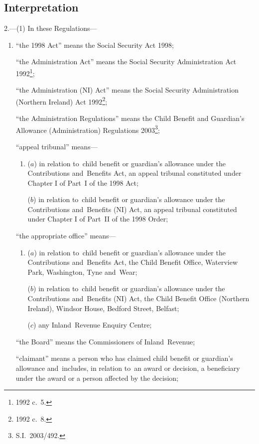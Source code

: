 \documentclass[12pt,a4paper]{article}
\begin{document}
\subsection[2. Interpretation]{Interpretation}

2.---(1)  In these Regulations—
\begin{enumerate}\item[]
“the 1998 Act” means the Social Security Act 1998;

“the Administration Act” means the Social Security Administration Act 1992\footnote{1992 c.~5.};

“the Administration (NI) Act” means the Social Security Administration (Northern Ireland) Act 1992\footnote{1992 c.~8.};

\begin{sloppypar}
“the Administration Regulations” means the Child Benefit and Guardian’s Allowance (Administration) Regulations 2003\footnote{S.I.~2003/492.};
\end{sloppypar}

“appeal tribunal” means—
\begin{enumerate}\item[]
($a$) 
in relation to~child benefit or guardian’s allowance under the Contributions and~Benefits Act, an appeal tribunal constituted under Chapter I of Part~I of the 1998 Act;

($b$) 
in relation to~child benefit or guardian’s allowance under the Contributions and~Benefits (NI) Act, an appeal tribunal constituted under Chapter I of Part~II of the 1998 Order;
\end{enumerate}

“the appropriate office” means—
\begin{enumerate}\item[]
($a$) 
in relation to~child benefit or guardian’s allowance under the Contributions and~Benefits Act, the Child Benefit Office, Waterview Park, Washington, Tyne and~Wear;

($b$) 
in relation to~child benefit or guardian’s allowance under the Contributions and~Benefits (NI) Act, the Child Benefit Office (Northern Ireland), Windsor House, Bedford Street, Belfast;

($c$) 
any Inland~Revenue Enquiry Centre;
\end{enumerate}

“the Board” means the Commissioners of Inland~Revenue;

“claimant” means a person who has claimed child benefit or guardian’s allowance and~includes, in relation to~an award or decision, a beneficiary under the award or a person affected by the decision;


\end{enumerate}
\end{document}
